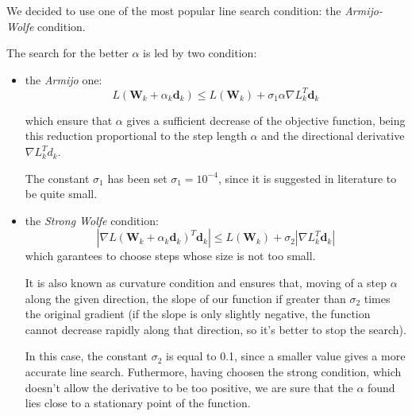 			We decided to use one of the most popular line search condition: the \textit{Armijo-Wolfe} condition.

			The search for the better $\alpha$ is led by two condition:
			\begin{itemize}
			\item the \textit{Armijo} one:
			\begin{equation}
			\textit{L}(\textbf{W}_k+\alpha _k\textbf{d}_k)\leq \textit{L}(\textbf{W}_k)+\sigma_1\alpha\nabla \textit{L}_k^T\textbf{d}_k
			\end{equation}

			which ensure that $\alpha$ gives a sufficient decrease of the objective function, being this reduction proportional to the step length $\alpha$ and the directional derivative $\nabla \textit{L}_k^Td_k$.

			The constant $\sigma_1$ has been set $\sigma_1=10^{-4}$, since it is suggested in literature to be quite small.

			\item the \textit{Strong Wolfe} condition:
			\begin{equation}
			|\nabla \textit{L}(\textbf{W}_k+\alpha _k\textbf{d}_k)^T\textbf{d}_k|\leq \textit{L}(\textbf{W}_k)+\sigma_2|\nabla \textit{L}_k^T\textbf{d}_k|
			\end{equation}
			which garantees to choose steps whose size is not too small.

			It is also known as curvature condition and ensures that, moving of a step $\alpha$ along the given direction, the slope of our function if greater than $\sigma_2$ times the original gradient (if the slope is only slightly negative, the function cannot decrease rapidly along that direction, so it's better to stop the search).

			In this case, the constant $\sigma_2$ is equal to 0.1, since a smaller value gives a more accurate line search.
			Futhermore, having choosen the strong condition, which doesn't allow the derivative to be too positive, we are sure that the $\alpha$ found lies close to a stationary point of the function.
			\end{itemize}

